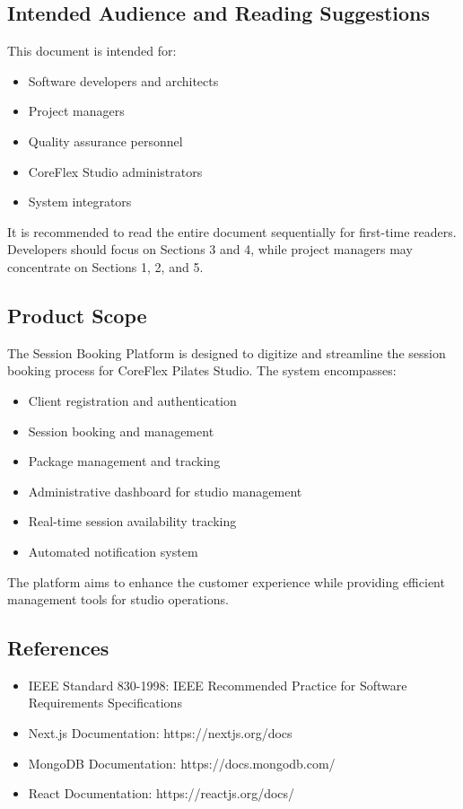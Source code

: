 \documentclass[12pt,a4paper]{article}
\begin{document}
\subsection{Intended Audience and Reading Suggestions}
This document is intended for:
\begin{itemize}
    \item Software developers and architects
    \item Project managers
    \item Quality assurance personnel
    \item CoreFlex Studio administrators
    \item System integrators
\end{itemize}

It is recommended to read the entire document sequentially for first-time readers. Developers should focus on Sections 3 and 4, while project managers may concentrate on Sections 1, 2, and 5.

\subsection{Product Scope}
The Session Booking Platform is designed to digitize and streamline the session booking process for CoreFlex Pilates Studio. The system encompasses:

\begin{itemize}
    \item Client registration and authentication
    \item Session booking and management
    \item Package management and tracking
    \item Administrative dashboard for studio management
    \item Real-time session availability tracking
    \item Automated notification system
\end{itemize}

The platform aims to enhance the customer experience while providing efficient management tools for studio operations.

\subsection{References}
\begin{itemize}
    \item IEEE Standard 830-1998: IEEE Recommended Practice for Software Requirements Specifications
    \item Next.js Documentation: https://nextjs.org/docs
    \item MongoDB Documentation: https://docs.mongodb.com/
    \item React Documentation: https://reactjs.org/docs/
\end{itemize}
\end{document}
